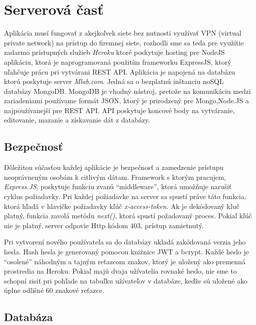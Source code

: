 \vspace{10pt}

\section{Serverová časť}

Aplikácia musí fungovať z akejkoľvek siete bez nutnosti využívať VPN (virtual private network) na prístup do firemnej siete, rozhodli sme sa teda pre využitie zadarmo prístupných služieb \textit{Heroku}  ktoré poskytuje hosting pre NodeJS aplikáciu, ktorá je naprogramovaná použitím frameworku ExpressJS, ktorý uľahčuje prácu pri vytvárani REST API. Aplikácia je napojená na databázu ktorú poskytuje server \textit{Mlab.com}. Jedná sa o bezplatnú inštanciu  noSQL databázy MongoDB. MongoDB je vhodný nástroj, pretože na komunikáciu medzi zariadeniami používame formát JSON, ktorý je prirodzený pre Mongo,Node.JS a najpoužívanejší pre REST API. API poskytuje koncové body na vytváranie, editovanie, mazanie a získavanie dát z databázy.

\subsection{Bezpečnosť}

Dôležitou súčasťou každej aplikácie je bezpečnosť a zamedzenie prístupu neoprávneným osobám k citlivým dátam. Framework s ktorým pracujem, \textit{Express.JS}, poskytuje funkciu zvanú ``middleware''\cite{express}, ktorá umožňuje narušiť cyklus požiadavky. Pri každej požiadavke na server sa spustí práve táto funkcia, ktorá hľadá v hlavičke požiadavky kľúč \textit{x-access-token}. Ak je dekódovaný kľuč platný, funkcia zavolá metódu \textit{next()}, ktorá spustí požadovaný proces. Pokiaľ kľúč nie je platný, server odpovie Http kódom 403, prístup zamietnutý. 

Pri vytvorení nového používateľa sa do databázy ukladá zakódovaná verzia jeho hesla. Hash hesla je generovaný pomocou knižnice JWT a bcrypt. Každé heslo je ``osolené'' náhodným a tajným reťazcom znakov, ktorý je uložený ako premenná prostredia na Heroku. Pokiaľ majú dvaja užívatelia rovnaké heslo, nie sme to schopní zisiť pri pohľade na tabuľku užívateľov v databáze, keďže sú uložené ako úplne odlišné 60 znakové reťazce.

\subsection{Databáza}

